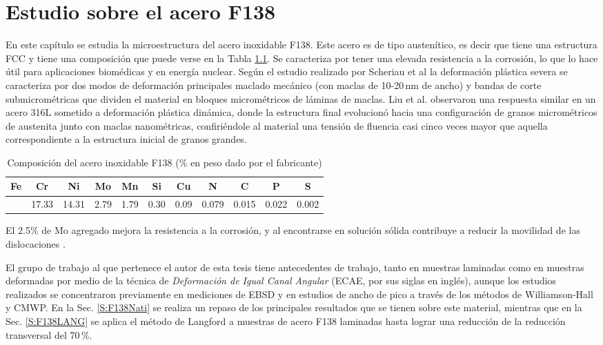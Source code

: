 \chapter{Estudio sobre el acero F138}\label{C:F138}
\graphicspath{{./figs/04_F138/}}

En este capítulo se estudia la microestructura del acero inoxidable F138.
Este acero es de tipo austenítico, es decir que tiene una estructura FCC y tiene una composición que puede verse en la Tabla \ref{tab:F138Comp}.
Se caracteriza por tener una elevada resistencia a la corrosión, lo que lo hace útil para aplicaciones biomédicas y en energía nuclear.
Según el estudio realizado por Scheriau et al \cite{Scheriau2011} la deformación plástica severa se caracteriza por dos modos de deformación principales maclado mecánico (con maclas de 10-20\,nm de ancho) y bandas de corte submicrométricas que dividen el material en bloques micrométricos de láminas de maclas.
Liu et al. \cite{Liu2010} observaron una respuesta similar en un acero 316L sometido a deformación plástica dinámica, donde la estructura final evolucionó hacia una configuración de granos micrométricos de austenita junto con maclas nanométricas, confiriéndole al material una tensión de fluencia casi cinco veces mayor que aquella correspondiente a la estructura inicial de granos grandes.

\begin{table}[!htb]
\centering
\caption{Composición del acero inoxidable F138 (\% en peso dado por el fabricante)}
\label{tab:F138Comp}
\begin{tabular}{|c|c|c|c|c|c|c|c|c|c|c|}
\hline
\rowcolor[HTML]{BBDAFF} 
\textbf{Fe} & \textbf{Cr} & \textbf{Ni} & \textbf{Mo} & \textbf{Mn} & \textbf{Si} & \textbf{Cu} & \textbf{N} & \textbf{C} & \textbf{P} & \textbf{S} \\ \hline
          &    17.33  &   14.31   &   2.79    &   1.79    &  0.30     &   0.09    &   0.079   &  0.015    &   0.022   &   0.002   \\ \hline
\end{tabular}
\end{table}

El 2.5\% de Mo agregado mejora la resistencia a la corrosión, y al encontrarse en solución sólida contribuye a reducir la movilidad de las dislocaciones \cite{Chowdhury2005}.

El grupo de trabajo al que pertenece el autor de esta tesis tiene antecedentes de trabajo, tanto en muestras laminadas como en muestras deformadas por medio de la técnica de \textit{Deformación de Igual Canal Angular} (ECAE, por sus siglas en inglés)\cite{Devincentis2015PhD,Devincentis2017}, aunque los estudios realizados se concentraron previamente en mediciones de EBSD y en estudios de ancho de pico a través de los métodos de Williamson-Hall y CMWP.
En la Sec. \ref{S:F138Nati} se realiza un repaso de los principales resultados que se tienen sobre este material, mientras que en la Sec. \ref{S:F138LANG} se aplica el método de Langford a muestras de acero F138 laminadas hasta lograr una reducción de la reducción transversal del 70\,\%.

